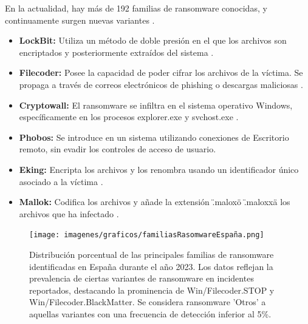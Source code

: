 
En la actualidad, hay más de 192 familias de ransomware conocidas, y continuamente surgen nuevas variantes \autocite{Herrero2024}.




\begin{minipage}[t]{0.45\textwidth}
    \vspace{0pt} %
    \begin{itemize}
        \item \textbf{LockBit:} Utiliza un método de doble presión en el que los archivos son encriptados y posteriormente extraídos del sistema \autocite{Bhushan2024}.
        \item \textbf{Filecoder:} Posee la capacidad de poder cifrar los archivos de la víctima. Se propaga a través de correos electrónicos de phishing o descargas maliciosas \autocite{WeLiveSecurity2013}.
        \item \textbf{Cryptowall:} El ransomware se infiltra en el sistema operativo Windows, específicamente en los procesos explorer.exe y svchost.exe \autocite{Proofpoint2023}.
        \item \textbf{Phobos:} Se introduce en un sistema utilizando conexiones de Escritorio remoto, sin evadir los controles de acceso de usuario.
        \item \textbf{Eking:} Encripta los archivos y los renombra usando un identificador único asociado a la víctima \autocite{Infordisa2021}.
        \item \textbf{Mallok:} Codifica los archivos y añade la extensión \".malox\" o \".maloxx\" a los archivos que ha infectado \autocite{CyberzaintzaND}.
        
    \end{itemize}   

    \end{minipage}%
    \hfill %
    \begin{minipage}[t]{0.45\textwidth}
    \vspace{0pt} %
    \centering %
      
\begin{figure}[H]
    \centering
    \texttt{[image: imagenes/graficos/familiasRasomwareEspaña.png]} %
    \caption{Distribución porcentual de las principales familias de ransomware identificadas en España durante el año 2023. Los datos reflejan la prevalencia de ciertas variantes de ransomware en incidentes reportados, destacando la prominencia de Win/Filecoder.STOP y Win/Filecoder.BlackMatter. Se considera ransomware 'Otros' a aquellas variantes con una frecuencia de detección inferior al 5\%.\autocite{Herrero2024}}
    \label{fig:mi-grafico}
\end{figure}
    \end{minipage}

